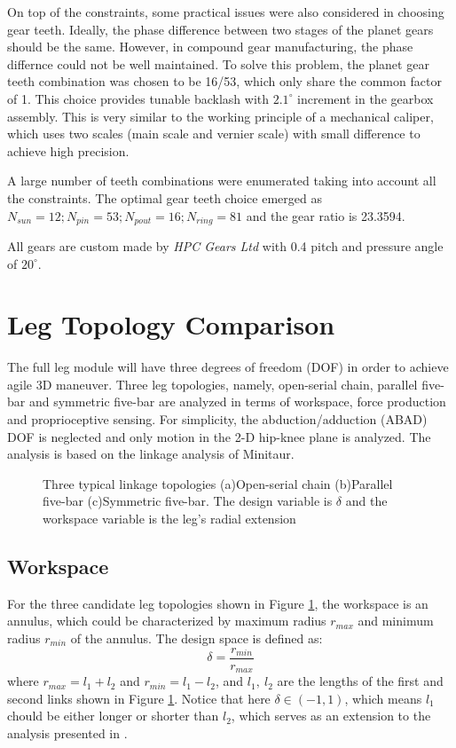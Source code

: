 On top of the constraints, some practical issues were also considered in choosing gear teeth. Ideally, the phase difference between two stages of the planet gears should be the same. However, in compound gear manufacturing, the phase differnce could not be well maintained. To solve this problem, the planet gear teeth combination was chosen to be 16/53, which only share the common factor of 1. This choice provides tunable backlash with $2.1^{\circ}$ increment in the gearbox assembly. This is very similar to the working principle of a mechanical caliper, which uses two scales (main scale and vernier scale) with small difference to achieve high precision.

A large number of teeth combinations were enumerated taking into account all the constraints. The optimal gear teeth choice emerged as $N_{sun} = 12; N_{pin} = 53; N_{pout} = 16; N_{ring} = 81$ and the gear ratio is 23.3594.

All gears are custom made by \textit{HPC Gears Ltd} with 0.4 pitch and pressure angle of $20^{\circ}$.

\section{Leg Topology Comparison}
\label{sec:LegComparison}
The full leg module will have three degrees of freedom (DOF) in order to achieve agile 3D maneuver. Three leg topologies, namely, open-serial chain, parallel five-bar and symmetric five-bar are analyzed in terms of workspace, force production and proprioceptive sensing. For simplicity, the abduction/adduction (ABAD) DOF is neglected and only motion in the 2-D hip-knee plane is analyzed. The analysis is based on the linkage analysis of Minitaur\cite{Kenneally2016}.

\begin{figure}
	\centering
	\caption{Three typical linkage topologies (a)Open-serial chain (b)Parallel five-bar (c)Symmetric five-bar. The design variable is $\delta$ and the workspace variable is the leg's radial extension}
	\label{fig:linkages}
\end{figure}

\subsection{Workspace}
\label{sec:workspace}
 	For the three candidate leg topologies shown in Figure \ref{fig:linkages}, the workspace is an annulus, which could be characterized by maximum radius $r_{max}$ and minimum radius $r_{min}$ of the annulus. The design space is defined as:
 	\begin{equation}
 		\delta=\frac{r_{min}}{r_{max}}
 	\end{equation}
 	where $r_{max} = l_1 + l_2$ and $r_{min} = l_1 - l_2$, and $l_1,~l_2$ are the lengths of the first and second links shown in Figure \ref{fig:linkages}. Notice that here $\delta \in (-1,1)$, which means $l_1$ chould be either longer or shorter than $l_2$, which serves as an extension to the analysis presented in \cite{Kenneally2016}.

